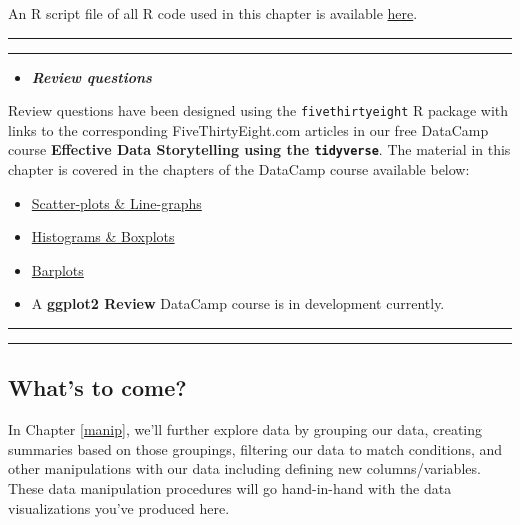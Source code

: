 \documentclass[]{tufte-book}
\let\oldrule=\rule
\renewcommand{\rule}[1]{\oldrule{\linewidth}}
\newenvironment{rmdblock}[1]
  {\begin{shaded*}
  \begin{itemize}
  \renewcommand{\labelitemi}{
    \raisebox{-.7\height}[0pt][0pt]{
    }
  }
  \item
  }
  {
  \end{itemize}
  \end{shaded*}
  }
\newenvironment{review}
  {\begin{rmdblock}{warning}}
  {\end{rmdblock}}
\theoremstyle{definition}
\theoremstyle{definition}
\theoremstyle{remark}
\begin{document}
An R script file of all R code used in this chapter is available
\href{http://ismayc.github.io/moderndiver-book/scripts/04-viz.R}{here}.

\begin{center}\rule{0.5\linewidth}{\linethickness}\end{center}

\begin{center}\rule{0.5\linewidth}{\linethickness}\end{center}

\begin{review}
\textbf{\emph{Review questions}}
\end{review}

Review questions have been designed using the \texttt{fivethirtyeight} R
package \citep{R-fivethirtyeight} with links to the corresponding
FiveThirtyEight.com articles in our free DataCamp course
\textbf{Effective Data Storytelling using the \texttt{tidyverse}}. The
material in this chapter is covered in the chapters of the DataCamp
course available below:

\begin{itemize}
\item
  \href{https://campus.datacamp.com/courses/effective-data-storytelling-using-the-tidyverse/scatter-plots-line-graphs}{Scatter-plots
  \& Line-graphs}
\item
  \href{https://campus.datacamp.com/courses/effective-data-storytelling-using-the-tidyverse/histograms-boxplots}{Histograms
  \& Boxplots}
\item
  \href{https://campus.datacamp.com/courses/effective-data-storytelling-using-the-tidyverse/barplots}{Barplots}
\item
  A \textbf{ggplot2 Review} DataCamp course is in development currently.
\end{itemize}

\begin{center}\rule{0.5\linewidth}{\linethickness}\end{center}

\begin{center}\rule{0.5\linewidth}{\linethickness}\end{center}

\subsection{What's to come?}\label{whats-to-come-1}

In Chapter \ref{manip}, we'll further explore data by grouping our data,
creating summaries based on those groupings, filtering our data to match
conditions, and other manipulations with our data including defining new
columns/variables. These data manipulation procedures will go
hand-in-hand with the data visualizations you've produced here.
\end{document}
